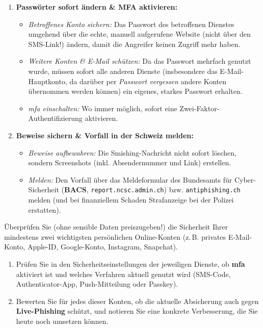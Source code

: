 \documentclass[12pt,a4paper]{article}
\begin{document}
\begin{solutionbox}
\begin{enumerate}
    \item \textbf{Passwörter sofort ändern \& MFA aktivieren:}
    \begin{itemize}
        \item \textit{Betroffenes Konto sichern:} Das Passwort des betroffenen Dienstes umgehend über die echte, manuell aufgerufene Website (nicht über den SMS-Link!) ändern, damit die Angreifer keinen Zugriff mehr haben.
        \item \textit{Weitere Konten \& E-Mail schützen:} Da das Passwort mehrfach genutzt wurde, müssen sofort alle anderen Dienste (insbesondere das E-Mail-Hauptkonto, da darüber per \textit{Passwort vergessen} andere Konten übernommen werden können) ein eigenes, starkes Passwort erhalten.
        \item \textit{\gls{mfa} einschalten:} Wo immer möglich, sofort eine Zwei-Faktor-Authentifizierung aktivieren.
    \end{itemize}

    \item \textbf{Beweise sichern \& Vorfall in der Schweiz melden:}
    \begin{itemize}
        \item \textit{Beweise aufbewahren:} Die Smishing-Nachricht nicht sofort löschen, \\ sondern Screenshots (inkl. Absendernummer und Link) erstellen.
        \item \textit{Melden:} Den Vorfall über das Meldeformular des Bundesamts für Cyber-Sicherheit (\textbf{BACS}, \texttt{report.ncsc.admin.ch}) bzw. \texttt{antiphishing.ch} melden (und bei finanziellem Schaden Strafanzeige bei der Polizei \mbox{erstatten}). 
    \end{itemize}
\end{enumerate}
\end{solutionbox}

\begin{taskbox}
Überprüfen Sie (ohne sensible Daten preiszugeben!) die Sicherheit Ihrer mindestens zwei wichtigsten persönlichen Online-Konten (z.\,B. privates E-Mail-Konto, Apple-ID, Google-Konto, Instagram, Snapchat).
\begin{enumerate}[label=\alph*)]
    \item Prüfen Sie in den Sicherheitseinstellungen der jeweiligen Dienste, ob \textbf{\gls{mfa}} aktiviert ist und welches Verfahren aktuell genutzt wird (SMS-Code, Authenticator-App, Push-Mitteilung oder Passkey).
    \item Bewerten Sie für jedes dieser Konten, ob die aktuelle Absicherung auch gegen \textbf{Live-Phishing} schützt, und notieren Sie eine konkrete Verbesserung, die Sie heute noch umsetzen können.
\end{enumerate}
\end{taskbox}
\end{document}
